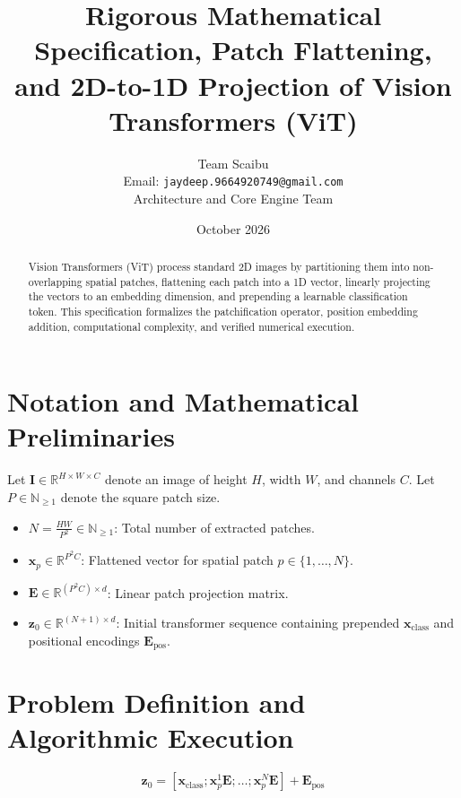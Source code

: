 \documentclass[11pt,a4paper]{article}
\title{\textbf{Rigorous Mathematical Specification, Patch Flattening, and 2D-to-1D Projection of Vision Transformers (ViT)}}
\author{Team Scaibu \\ \small Email: \texttt{jaydeep.9664920749@gmail.com} \\ \small Architecture and Core Engine Team}
\date{October 2026}
\theoremstyle{definition}
\begin{document}
\maketitle

\begin{abstract}
Vision Transformers (ViT) process standard 2D images by partitioning them into non-overlapping spatial patches, flattening each patch into a 1D vector, linearly projecting the vectors to an embedding dimension, and prepending a learnable classification token. This specification formalizes the patchification operator, position embedding addition, computational complexity, and verified numerical execution.
\end{abstract}

\section{Notation and Mathematical Preliminaries}

Let $\mathbf{I} \in \mathbb{R}^{H \times W \times C}$ denote an image of height $H$, width $W$, and channels $C$. Let $P \in \mathbb{N}_{\ge 1}$ denote the square patch size.

\begin{itemize}
    \item $N = \frac{HW}{P^2} \in \mathbb{N}_{\ge 1}$: Total number of extracted patches.
    \item $\mathbf{x}_p \in \mathbb{R}^{P^2 C}$: Flattened vector for spatial patch $p \in \{1, \dots, N\}$.
    \item $\mathbf{E} \in \mathbb{R}^{(P^2 C) \times d}$: Linear patch projection matrix.
    \item $\mathbf{z}_0 \in \mathbb{R}^{(N + 1) \times d}$: Initial transformer sequence containing prepended $\mathbf{x}_{\text{class}}$ and positional encodings $\mathbf{E}_{\text{pos}}$.
\end{itemize}

\section{Problem Definition and Algorithmic Execution}

\begin{equation}
\mathbf{z}_0 = [\mathbf{x}_{\text{class}}; \mathbf{x}_p^1 \mathbf{E}; \dots; \mathbf{x}_p^N \mathbf{E}] + \mathbf{E}_{\text{pos}}
\end{equation}
\end{document}
